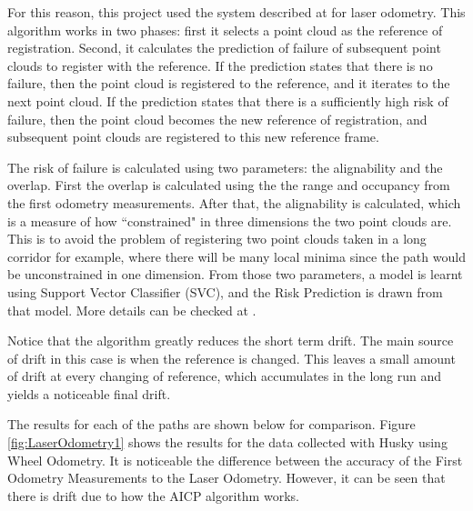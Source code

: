 \documentclass[11pt]{article}
\begin{document}
For this reason, this project used the system described at \cite{AICPAlign} for laser odometry. This algorithm works in two phases: first it selects a point cloud as the reference of registration. Second, it calculates the prediction of failure of subsequent point clouds to register with the reference. If the prediction states that there is no failure, then the point cloud is registered to the reference, and it iterates to the next point cloud. If the prediction states that there is a sufficiently high risk of failure, then the point cloud becomes the new reference of registration, and subsequent point clouds are registered to this new reference frame.
	
The risk of failure is calculated using two parameters: the alignability and the overlap. First the overlap is calculated using the the range and occupancy from the first odometry measurements. After that, the alignability is calculated, which is a measure of how ``constrained" in three dimensions the two point clouds are. This is to avoid the problem of registering two point clouds taken in a long corridor for example, where there will be many local minima since the path would be unconstrained in one dimension. From those two parameters, a model is learnt using Support Vector Classifier (SVC), and the Risk Prediction is drawn from that model. More details can be checked at \cite{AICPAlign}.

Notice that the algorithm greatly reduces the short term drift. The main source of drift in this case is when the reference is changed. This leaves a small amount of drift at every changing of reference, which accumulates in the long run and yields a noticeable final drift.
	
The results for each of the paths are shown below for comparison. Figure \ref{fig:LaserOdometry1} shows the results for the data collected with Husky using Wheel Odometry. It is noticeable the difference between the accuracy of the First Odometry Measurements to the Laser Odometry. However, it can be seen that there is drift due to how the AICP algorithm works.
\end{document}
